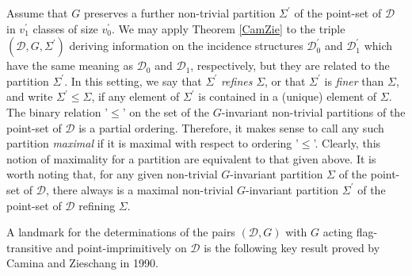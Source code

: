 \documentclass[a4paper,twopage,reqno,12pt]{amsart}
\theoremstyle{definition}
\numberwithin{equation}{section}
\renewcommand{\leq}{\leqslant}
\begin{document}
Assume that $G$ preserves a further non-trivial partition $\Sigma^{\prime}$ of the point-set of $\mathcal{D}$ in $v_{1}^{\prime}$ classes of size $v_{0}^{\prime}$. We may apply Theorem \ref{CamZie} to the triple $(\mathcal{D},G,\Sigma^{\prime})$ deriving information on the incidence structures $\mathcal{D}_{0}^{\prime}$ and $\mathcal{D}_{1}^{\prime}$ which have the same meaning as $\mathcal{D}_{0}$ and $\mathcal{D}_{1}$, respectively, but they are related to the partition $\Sigma^{\prime}$. In this setting, we say that $\Sigma^{\prime}$ \emph{refines} $\Sigma$, or that $\Sigma^{\prime}$ is \emph{finer} than $\Sigma$, and write $\Sigma^{\prime} \leq \Sigma$, if any element of $\Sigma^{\prime}$ is contained in a (unique) element of $\Sigma$. The binary relation '$\leq$' on the set of the $G$-invariant non-trivial partitions of the point-set of $\mathcal{D}$ is a partial ordering. Therefore, it makes sense to call any such partition \emph{maximal} if it is maximal with respect to ordering '$\leq$'. Clearly, this notion of maximality for a partition are equivalent to that given above. It is worth noting that, for any given non-trivial $G$-invariant partition $\Sigma$ of the point-set of $\mathcal{D}$, there always is a maximal non-trivial $G$-invariant partition $\Sigma^{\prime}$ of the point-set of $\mathcal{D}$ refining $\Sigma$.

\bigskip

A landmark for the determinations of the pairs $\left(\mathcal{D},G\right)$ with $G$ acting flag-transitive and point-imprimitively on $\mathcal{D}$ is the following key result proved by Camina and Zieschang \cite{CZ} in 1990. 

\bigskip
\end{document}
